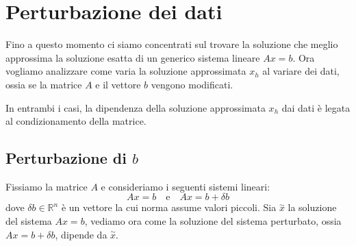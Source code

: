 \section{Perturbazione dei dati}
Fino a questo momento ci siamo concentrati sul trovare la soluzione che meglio
approssima la soluzione esatta di un generico sistema lineare $Ax=b$. Ora vogliamo
analizzare come varia la soluzione approssimata $x_h$ al variare dei dati, ossia
se la matrice $A$ e il vettore $b$ vengono modificati.

In entrambi i casi, la dipendenza della soluzione approssimata $x_h$ dai dati
è legata al condizionamento della matrice.
\subsection{Perturbazione di $b$}
Fissiamo la matrice $A$ e consideriamo i seguenti sistemi lineari:
\begin{equation}
    Ax=b \quad \text{e} \quad Ax=b+\delta b
\end{equation}
dove $\delta b \in \mathbb{R}^n$ è un vettore la cui norma assume valori piccoli.
Sia $\stackrel{\sim}{x}$ la soluzione del sistema $Ax = b$, vediamo ora come la
soluzione del sistema perturbato, ossia $Ax = b + \delta b$, dipende da $\stackrel{\sim}{x}$.

